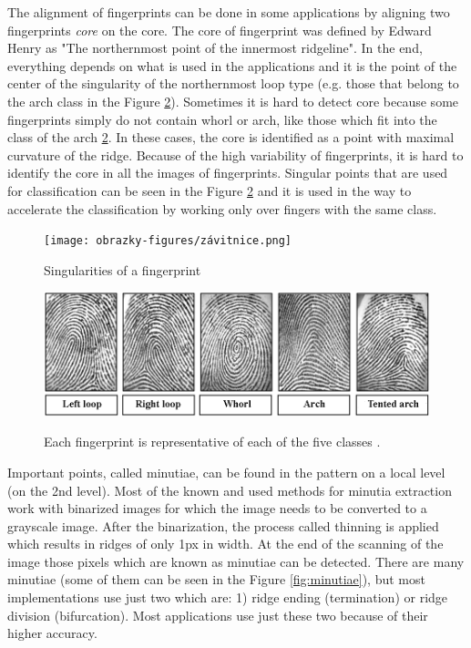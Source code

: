 The alignment of fingerprints can be done in some applications by aligning two fingerprints \emph{core} on the core. The core of fingerprint was defined by Edward Henry as "The northernmost point of the innermost ridgeline". In the end, everything depends on what is used in the applications and it is the point of the center of the singularity of the northernmost loop type (e.g. those that belong to the arch class in the Figure \ref{fig:classes}). Sometimes it is hard to detect core because some fingerprints simply do not contain whorl or arch, like those which fit into the class of the arch \ref{fig:classes}. In these cases, the core is identified as a point with maximal curvature of the ridge. Because of the high variability of fingerprints, it is hard to identify the core in all the images of fingerprints. Singular points that are used for classification can be seen in the Figure \ref{fig:classes} and it is used in the way to accelerate the classification by working only over fingers with the same class. \cite{daluz2018fundamentals}

\begin{figure}[H]
    \centering
        {\texttt{[image: obrazky-figures/závitnice.png]}}\\
        \caption{Singularities of a fingerprint \cite{maltoni2009handbook}}
        \label{fig:singularities}
\end{figure}

\begin{figure}[H]
    \centering
        {\includegraphics[width=1\linewidth]{obrazky-figures/classes.png}}\\
        \caption{Each fingerprint is representative of each of the five classes \cite{maltoni2009handbook} \cite{henry1900classification}.}
        \label{fig:classes}
\end{figure}

Important points, called minutiae, can be found in the pattern on a local level (on the 2nd level). Most of the known and used methods for minutia extraction work with binarized images for which the image needs to be converted to a grayscale image. After the binarization, the process called thinning is applied which results in ridges of only 1px in width. At the end of the scanning of the image those pixels which are known as minutiae can be detected. There are many minutiae (some of them can be seen in the Figure \ref{fig:minutiae}), but most implementations use just two which are: 1) ridge ending (termination) or ridge division (bifurcation). Most applications use just these two because of their higher accuracy. \cite{jain2007handbook} \cite{naser}

